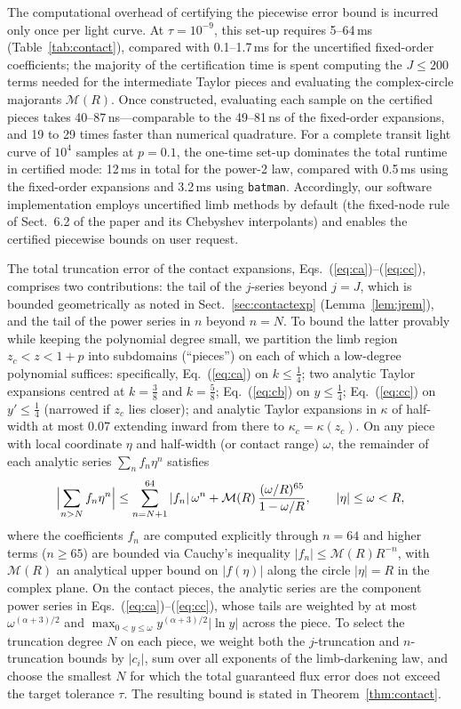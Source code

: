 \documentclass[11pt]{article}
\begin{document}
The computational overhead of certifying the piecewise error bound is incurred only once per light curve. At $\tau=10^{-9}$, this set-up requires 5--64\,ms (Table~\ref{tab:contact}), compared with 0.1--1.7\,ms for the uncertified fixed-order coefficients; the majority of the certification time is spent computing the $J\le 200$ terms needed for the intermediate Taylor pieces and evaluating the complex-circle majorants $\mathcal M(R)$. Once constructed, evaluating each sample on the certified pieces takes 40--87\,ns---comparable to the 49--81\,ns of the fixed-order expansions, and 19 to 29 times faster than numerical quadrature. For a complete transit light curve of $10^4$ samples at $p=0.1$, the one-time set-up dominates the total runtime in certified mode: 12\,ms in total for the power-2 law, compared with 0.5\,ms using the fixed-order expansions and 3.2\,ms using \texttt{batman}. Accordingly, our software implementation employs uncertified limb methods by default (the fixed-node rule of Sect.~6.2 of the paper and its Chebyshev interpolants) and enables the certified piecewise bounds on user request.

The total truncation error of the contact expansions, Eqs.~(\ref{eq:ca})--(\ref{eq:cc}), comprises two contributions: the tail of the $j$-series beyond $j=J$, which is bounded geometrically as noted in Sect.~\ref{sec:contactexp} (Lemma~\ref{lem:jrem}), and the tail of the power series in $n$ beyond $n=N$. To bound the latter provably while keeping the polynomial degree small, we partition the limb region $z_c<z<1+p$ into subdomains (``pieces'') on each of which a low-degree polynomial suffices: specifically, Eq.~(\ref{eq:ca}) on $k\le\tfrac14$; two analytic Taylor expansions centred at $k=\tfrac38$ and $k=\tfrac58$; Eq.~(\ref{eq:cb}) on $y\le\tfrac14$; Eq.~(\ref{eq:cc}) on $y'\le\tfrac14$ (narrowed if $z_c$ lies closer); and analytic Taylor expansions in $\kappa$ of half-width at most 0.07 extending inward from there to $\kappa_c=\kappa(z_c)$. On any piece with local coordinate $\eta$ and half-width (or contact range) $\omega$, the remainder of each analytic series $\sum_nf_n\eta^n$ satisfies
\begin{equation}
\Bigl|\sum_{n>N}f_n\eta^n\Bigr|\le\sum_{n=N+1}^{64}|f_n|\,\omega^n+\mathcal M(R)\,\frac{(\omega/R)^{65}}{1-\omega/R},\qquad |\eta|\le \omega<R, \label{eq:tailbound}
\end{equation}
where the coefficients $f_n$ are computed explicitly through $n=64$ and higher terms ($n\ge 65$) are bounded via Cauchy's inequality $|f_n|\le \mathcal M(R)R^{-n}$, with $\mathcal M(R)$ an analytical upper bound on $|f(\eta)|$ along the circle $|\eta|=R$ in the complex plane. On the contact pieces, the analytic series are the component power series in Eqs.~(\ref{eq:ca})--(\ref{eq:cc}), whose tails are weighted by at most $\omega^{(\alpha+3)/2}$ and $\max_{0<y\le \omega}y^{(\alpha+3)/2}|\ln y|$ across the piece. To select the truncation degree $N$ on each piece, we weight both the $j$-truncation and $n$-truncation bounds by $|c_i|$, sum over all exponents of the limb-darkening law, and choose the smallest $N$ for which the total guaranteed flux error does not exceed the target tolerance $\tau$. The resulting bound is stated in Theorem~\ref{thm:contact}.
\end{document}
